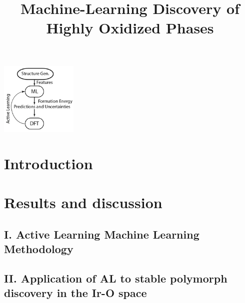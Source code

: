 \documentclass[a6paper,journal=jacsat,manuscript=article]{achemso}  %
\title[ML discovered IrOx phases]{
  Machine-Learning Discovery of Highly Oxidized \IrOx Phases}
\begin{document}
\begin{tocentry}
\begin{center}
\includegraphics[height=3.5cm]{02_figures/Surrogate_model}
\end{center}
\end{tocentry}


\begin{abstract}

\end{abstract}

\section{Introduction}


\section{Results and discussion}

  \subsection{I. Active Learning Machine Learning Methodology}
  

  \subsection{II. Application of AL to stable polymorph discovery in the Ir-O space}
  
\end{document}
